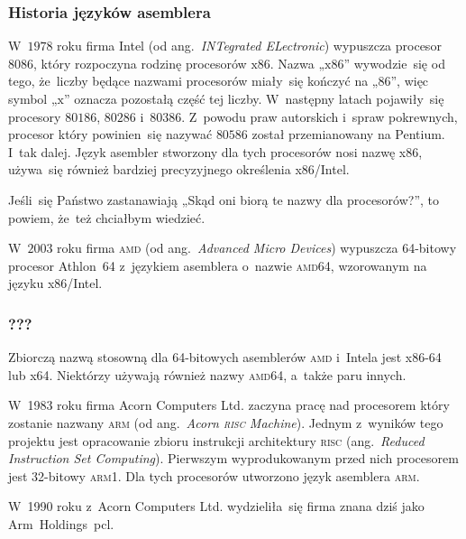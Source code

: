 \documentclass[10pt,t]{beamer}
\begin{document}
\begin{frame}
  \frametitle{Historia języków asemblera}


  W~$1978$ roku firma Intel (od ang.~\textit{INTegrated ELectronic})
  wypuszcza procesor $8086$, który rozpoczyna rodzinę procesorów
  $\text{x}86$. Nazwa „$\text{x}86$” wywodzie~się od tego, że~liczby
  będące nazwami procesorów miały~się kończyć na „$86$”, więc symbol
  „$\text{x}$” oznacza pozostałą część tej liczby. W~następny latach
  pojawiły~się procesory $80186$, $80286$ i~$80386$. Z~powodu praw
  autorskich i~spraw pokrewnych, procesor który powinien~się nazywać
  $80586$ został przemianowany na Pentium. I~tak dalej. Język asembler
  stworzony dla tych procesorów nosi nazwę \alert{x86}, używa~się również
  bardziej precyzyjnego określenia \alert{x86/Intel}.

  Jeśli~się Państwo zastanawiają „Skąd oni biorą te nazwy dla procesorów?”,
  to powiem, że~też chciałbym wiedzieć.

  W~$2003$ roku firma \textsc{amd} (od ang.~\textit{Advanced Micro Devices})
  wypuszcza 64-bitowy procesor Athlon~64 z~językiem asemblera o~nazwie
  \textsc{amd}64, wzorowanym na języku x86/Intel.

\end{frame}





\begin{frame}
  \frametitle{???}


  Zbiorczą nazwą stosowną dla 64-bitowych asemblerów \textsc{amd} i~Intela
  jest \alert{x86-64} lub \alert{x64}. Niektórzy używają również nazwy
  \alert{\textsc{amd}64}, a~także paru innych.

  W~1983 roku firma Acorn Computers Ltd. zaczyna pracę nad procesorem który
  zostanie nazwany \alert{\textsc{arm}} (od ang.~\textit{Acorn \textsc{risc}
    Machine}). Jednym z~wyników tego projektu jest opracowanie zbioru
  instrukcji architektury \textsc{risc} (ang.~\textit{Reduced Instruction
    Set Computing}). Pierwszym wyprodukowanym przed nich procesorem jest
  32-bitowy \textsc{arm1}. Dla tych procesorów utworzono język asemblera
  \alert{\textsc{arm}}.

  W~1990 roku z~Acorn Computers Ltd. wydzieliła~się firma znana dziś jako
  Arm~Holdings~pcl.

\end{frame}
\end{document}
